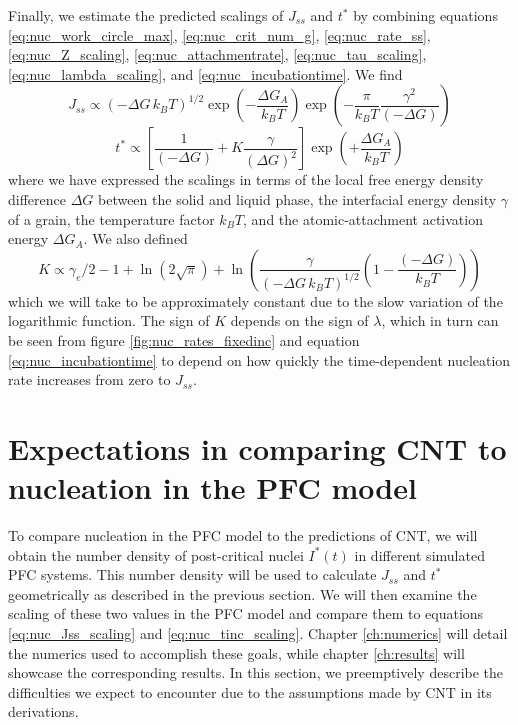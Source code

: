 Finally, we estimate the predicted scalings of $J_{ss}$ and $t^*$ by combining equations \ref{eq:nuc_work_circle_max}, \ref{eq:nuc_crit_num_g}, \ref{eq:nuc_rate_ss}, \ref{eq:nuc_Z_scaling}, \ref{eq:nuc_attachmentrate}, \ref{eq:nuc_tau_scaling}, \ref{eq:nuc_lambda_scaling}, and \ref{eq:nuc_incubationtime}. We find
\begin{equation}\label{eq:nuc_Jss_scaling}
J_{ss} \propto (-\Delta G \, k_B T)^{1/2}\exp\left(-\frac{\Delta G_A}{k_B T}\right)\exp\left(-\frac{\pi}{k_B T}\frac{\gamma^2}{(-\Delta G)}\right)
\end{equation}
\begin{equation}\label{eq:nuc_tinc_scaling}
t^* \propto \left[\frac{1}{(-\Delta G)}+K\frac{\gamma}{(\Delta G)^2}\right]\exp\left(+\frac{\Delta G_A}{k_B T}\right)
\end{equation}
where we have expressed the scalings in terms of the local free energy density difference $\Delta G$ between the solid and liquid phase, the interfacial energy density $\gamma$ of a grain, the temperature factor $k_B T$, and the atomic-attachment activation energy $\Delta G_A$. We also defined
\begin{equation}
K \propto \gamma_e/2-1+ \ln\left(2\sqrt{\pi}\right)+\ln\left(\frac{\gamma}{(-\Delta G \, k_B T)^{1/2}}  \left(1-\frac{(-\Delta G)}{k_B T}\right)  \right) 
\end{equation}
which we will take to be approximately constant due to the slow variation of the logarithmic function. The sign of $K$ depends on the sign of $\lambda$, which in turn can be seen from figure \ref{fig:nuc_rates_fixedinc} and equation \ref{eq:nuc_incubationtime} to depend on how quickly the time-dependent nucleation rate increases from zero to $J_{ss}$.


\section{Expectations in comparing CNT to nucleation in the PFC model}\label{sec:nuc_cnt_pfc}

To compare nucleation in the PFC model to the predictions of CNT, we will obtain the number density of post-critical nuclei $I^*(t)$ in different simulated PFC systems. This number density will be used to calculate $J_{ss}$ and $t^*$ geometrically as described in the previous section. We will then examine the scaling of these two values in the PFC model and compare them to equations \ref{eq:nuc_Jss_scaling} and \ref{eq:nuc_tinc_scaling}. Chapter \ref{ch:numerics} will detail the numerics used to accomplish these goals, while chapter \ref{ch:results} will showcase the corresponding results. In this section, we preemptively describe the difficulties we expect to encounter due to the assumptions made by CNT in its derivations.

